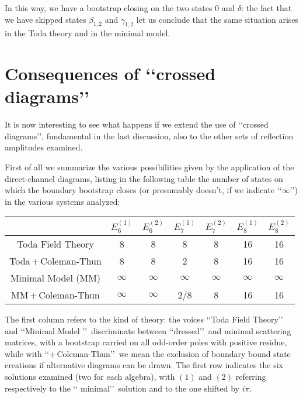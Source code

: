 \documentclass[a4paper,12pt]{report}
\begin{document}
In this way, we have a bootstrap closing on the two states $0$ and $\delta$: the fact that we have skipped states
$\beta_{1,2}$ and $\gamma_{1,2}$ let us conclude that the same situation arises in the Toda theory and in the
minimal model.

\vspace{1cm}


\section{Consequences of \lq\lq crossed diagrams\rq\rq}

It is now interesting to see what happens if we extend the use of \lq\lq crossed diagrams\rq\rq, fundamental in
the last discussion, also to the other sets of reflection amplitudes examined.

First of all we summarize the various possibilities given by the application of the direct-channel diagrams,
listing in the following table the number of states on which the boundary bootstrap closes (or presumably doesn't,
if we indicate \lq\lq$\infty$\rq\rq) in the various systems analyzed:

\begin{center}
\begin{tabular}{|c|c c|c c|c c|}\hline
&  $ E_{6}^{(1)}$  & $ E_{6}^{(2)}$ & $ E_{7}^{(1)}$ & $ E_{7}^{(2)}$ & $ E_{8}^{(1)}$ & $ E_{8}^{(2)}$ \\ \hline
Toda Field Theory  & 8 & 8 & 8 & 8 & 16 & 16 \\
Toda\,+\,Coleman-Thun  & 8 & 8 & 2 & 8 & 16 & 16 \\ \hline
Minimal Model (MM) & $\infty$ & $\infty$ & $\infty$ & $\infty$ & $\infty$ & $\infty$ \\
MM\,+\,Coleman-Thun & $\infty$ & $\infty$ & 2/8 & 8 & 16 & 16 \\ \hline

  \end{tabular}
\end{center}

\vspace{0.5cm}

The first column refers to the kind of theory: the voices \lq\lq Toda Field Theory\rq\rq \, and \lq\lq Minimal
Model \rq\rq \, discriminate between \lq\lq dressed\rq\rq \, and minimal scattering matrices, with a bootstrap
carried on all odd-order poles with positive residue, while with \lq\lq +\,Coleman-Thun\rq\rq \, we mean the
exclusion of boundary bound state creations if alternative diagrams can be drawn. The first row indicates the six
solutions examined (two for each algebra), with $(1)$ and $(2)$ referring respectively to the \lq\lq
minimal\rq\rq \, solution and to the one shifted by $i\pi$.
\end{document}
